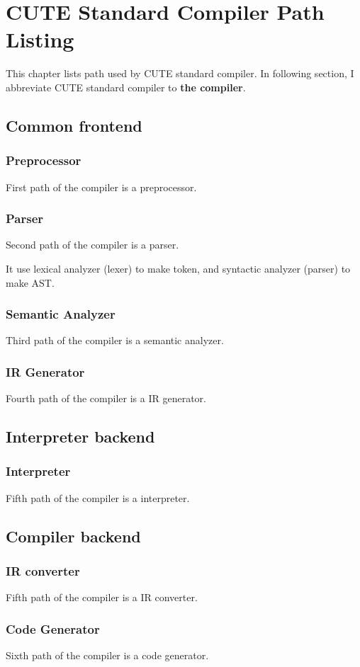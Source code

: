 \documentclass[a4paper, article, oneside, 10pt]{memoir}
\begin{document}
\pagestyle{ruled}
\chapter{CUTE Standard Compiler Path Listing}
This chapter lists path used by CUTE standard compiler.
In following section, I abbreviate CUTE standard compiler to \textbf{the compiler}.

\section{Common frontend}
\subsection{Preprocessor}
First path of the compiler is a preprocessor.

\subsection{Parser}
Second path of the compiler is a parser.

It use lexical analyzer (lexer) to make token,
and syntactic analyzer (parser) to make AST.

\subsection{Semantic Analyzer}
Third path of the compiler is a semantic analyzer.

\subsection{IR Generator}
Fourth path of the compiler is a IR generator.

\section{Interpreter backend}
\subsection{Interpreter}
Fifth path of the compiler is a interpreter.

\section{Compiler backend}
\subsection{IR converter}
Fifth path of the compiler is a IR converter.

\subsection{Code Generator}
Sixth path of the compiler is a code generator.
\end{document}
